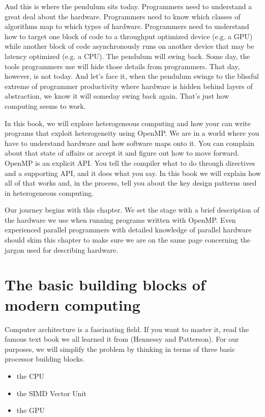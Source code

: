 And this is where the pendulum sits today.   Programmers need to understand a great deal about the hardware.  Programmers need to 
know which classes of algorithms map to which types of hardware.  Programmers need to understand how to target one block of 
code to a throughput optimized device (e.g. a GPU) while another block of code asynchronously runs on another device
that may be latency optimized (e.g. a CPU).  The pendulum will swing back.  Some day, the tools programmers use will 
hide those details from programmers.   That day, however, is not today.   And let's face it, when the pendulum swings to the
blissful extreme of programmer productivity where hardware is hidden behind layers of abstraction, we know it will someday
swing back again.  That's just how computing seems to work.

In this book, we will explore heterogeneous computing and how your can write programs that exploit heterogeneity 
using OpenMP.  We are in a world where you have to understand hardware and how software maps onto it.   You can 
complain about that state of affairs or accept it and figure out how to move forward.  OpenMP is an explicit API.  You 
tell the compiler what to do through directives and a supporting API, and it does what you say.    In this book we will
explain how all of that works and, in the process, tell you about the key design patterns used in heterogeneous computing.

Our journey begins with this chapter.  We set the stage with a brief description of the hardware we use when
running programs written with OpenMP.   Even experienced parallel programmers with detailed knowledge of
parallel hardware should skim this chapter to make sure we are on the same page concerning the jargon used
for describing hardware.

\section{The basic building blocks of modern computing}

Computer architecture is a fascinating field. If you want to master it, read the
famous text book we all learned it from (Hennessy and Patterson).  For our purposes, 
we will simplify the problem by thinking in terms of three basic processor building blocks.

\begin{itemize}
\item  the CPU
\item  the SIMD Vector Unit
\item  the GPU
\end{itemize}

